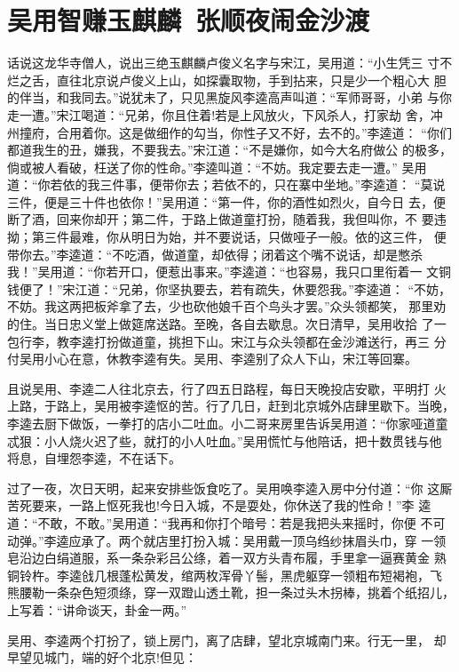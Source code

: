 \chapter{吴用智赚玉麒麟~张顺夜闹金沙渡}

话说这龙华寺僧人，说出三绝玉麒麟卢俊义名字与宋江，吴用道：“小生凭三
寸不烂之舌，直往北京说卢俊义上山，如探囊取物，手到拈来，只是少一个粗心大
胆的伴当，和我同去。”说犹未了，只见黑旋风李逵高声叫道：“军师哥哥，小弟
与你走一遭。”宋江喝道：“兄弟，你且住着!若是上风放火，下风杀人，打家劫
舍，冲州撞府，合用着你。这是做细作的勾当，你性子又不好，去不的。”李逵道：
“你们都道我生的丑，嫌我，不要我去。”宋江道：“不是嫌你，如今大名府做公
的极多，倘或被人看破，枉送了你的性命。”李逵叫道：“不妨。我定要去走一遭。”
吴用道：“你若依的我三件事，便带你去；若依不的，只在寨中坐地。”李逵道：
“莫说三件，便是三十件也依你！”吴用道：“第一件，你的酒性如烈火，自今日
去，便断了酒，回来你却开；第二件，于路上做道童打扮，随着我，我但叫你，不
要违拗；第三件最难，你从明日为始，并不要说话，只做哑子一般。依的这三件，
便带你去。”李逵道：“不吃酒，做道童，却依得；闭着这个嘴不说话，却是憋杀
我！”吴用道：“你若开口，便惹出事来。”李逵道：“也容易，我只口里衔着一
文铜钱便了！”宋江道：“兄弟，你坚执要去，若有疏失，休要怨我。”李逵道：
“不妨，不妨。我这两把板斧拿了去，少也砍他娘千百个鸟头才罢。”众头领都笑，
那里劝的住。当日忠义堂上做筵席送路。至晚，各自去歇息。次日清早，吴用收拾
了一包行李，教李逵打扮做道童，挑担下山。宋江与众头领都在金沙滩送行，再三
分付吴用小心在意，休教李逵有失。吴用、李逵别了众人下山，宋江等回寨。

且说吴用、李逵二人往北京去，行了四五日路程，每日天晚投店安歇，平明打
火上路，于路上，吴用被李逵怄的苦。行了几日，赶到北京城外店肆里歇下。当晚，
李逵去厨下做饭，一拳打的店小二吐血。小二哥来房里告诉吴用道：“你家哑道童
忒狠：小人烧火迟了些，就打的小人吐血。”吴用慌忙与他陪话，把十数贯钱与他
将息，自埋怨李逵，不在话下。

过了一夜，次日天明，起来安排些饭食吃了。吴用唤李逵入房中分付道：“你
这厮苦死要来，一路上怄死我也!今日入城，不是耍处，你休送了我的性命！”李
逵道：“不敢，不敢。”吴用道：“我再和你打个暗号：若是我把头来摇时，你便
不可动弹。”李逵应承了。两个就店里打扮入城：吴用戴一顶乌绉纱抹眉头巾，穿
一领皂沿边白绢道服，系一条杂彩吕公绦，着一双方头青布履，手里拿一逼赛黄金
熟铜铃杵。李逵戗几根蓬松黄发，绾两枚浑骨丫髻，黑虎躯穿一领粗布短褐袍，飞
熊腰勒一条杂色短须绦，穿一双蹬山透土靴，担一条过头木拐棒，挑着个纸招儿，
上写着：“讲命谈天，卦金一两。”

吴用、李逵两个打扮了，锁上房门，离了店肆，望北京城南门来。行无一里，
却早望见城门，端的好个北京!但见：


